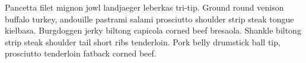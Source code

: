 
Pancetta filet mignon jowl landjaeger leberkas tri-tip. Ground round venison buffalo turkey, andouille pastrami salami
prosciutto shoulder strip steak tongue kielbasa. Burgdoggen jerky biltong capicola corned beef bresaola. Shankle biltong 
strip steak shoulder tail short ribs tenderloin. Pork belly drumstick ball tip, prosciutto tenderloin fatback corned beef.